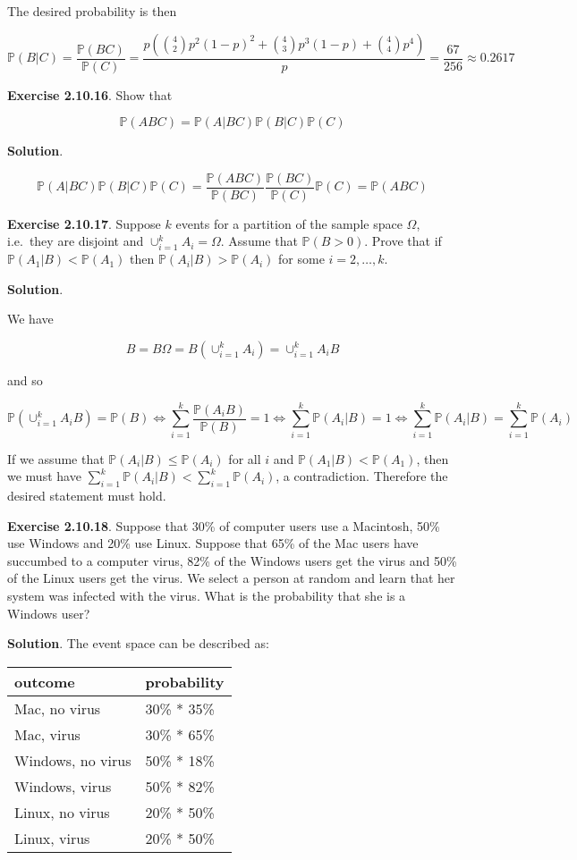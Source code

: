 The desired probability is then

\[ \mathbb{P}(B | C) = \frac{\mathbb{P}(BC)}{\mathbb{P}(C)} = \frac{p \left(\binom{4}{2} p^2 (1-p)^2 + \binom{4}{3} p^3 (1 - p) + \binom{4}{4} p^4 \right)}{ p } = \frac{67}{256} \approx 0.2617 \]

\textbf{Exercise 2.10.16}. Show that

\[  \mathbb{P}(ABC) = \mathbb{P}(A | BC) \mathbb{P}(B | C) \mathbb{P}(C) \]

\textbf{Solution}.

\[ \mathbb{P}(A | BC) \mathbb{P}(B | C) \mathbb{P}(C) = \frac{\mathbb{P}(ABC)}{\mathbb{P}(BC)}  \frac{\mathbb{P}(BC)}{\mathbb{P}(C)} \mathbb{P}(C) = \mathbb{P}(ABC) \]

\textbf{Exercise 2.10.17}. Suppose \(k\) events for a partition of the
sample space \(\Omega\), i.e.~they are disjoint and
\(\cup_{i=1}^k A_i = \Omega\). Assume that \(\mathbb{P}(B > 0)\). Prove
that if \(\mathbb{P}(A_1 | B) < \mathbb{P}(A_1)\) then
\(\mathbb{P}(A_i | B) > \mathbb{P}(A_i)\) for some \(i = 2, \dots, k\).

\textbf{Solution}.

We have

\[ B = B\Omega = B \left( \cup_{i=1}^k A_i \right) = \cup_{i=1}^k A_i B \]

and so

\[ \mathbb{P}\left( \cup_{i=1}^k A_i B \right) = \mathbb{P}(B) 
\Longleftrightarrow \sum_{i=1}^k \frac{\mathbb{P}(A_i B)}{\mathbb{P}(B)} = 1
\Longleftrightarrow \sum_{i=1}^k \mathbb{P}(A_i | B) = 1
\Longleftrightarrow \sum_{i=1}^k \mathbb{P}(A_i | B) = \sum_{i=1}^k \mathbb{P}(A_i)
\]

If we assume that \(\mathbb{P}(A_i | B) \leq \mathbb{P}(A_i)\) for all
\(i\) and \(\mathbb{P}(A_1 | B) < \mathbb{P}(A_1)\), then we must have
\(\sum_{i=1}^k \mathbb{P}(A_i | B) < \sum_{i=1}^k \mathbb{P}(A_i)\), a
contradiction. Therefore the desired statement must hold.

\textbf{Exercise 2.10.18}. Suppose that 30\% of computer users use a
Macintosh, 50\% use Windows and 20\% use Linux. Suppose that 65\% of the
Mac users have succumbed to a computer virus, 82\% of the Windows users
get the virus and 50\% of the Linux users get the virus. We select a
person at random and learn that her system was infected with the virus.
What is the probability that she is a Windows user?

\textbf{Solution}. The event space can be described as:

\begin{longtable}[]{@{}ll@{}}
\toprule\noalign{}
outcome & probability \\
\midrule\noalign{}
\endhead
\bottomrule\noalign{}
\endlastfoot
Mac, no virus & 30\% * 35\% \\
Mac, virus & 30\% * 65\% \\
Windows, no virus & 50\% * 18\% \\
Windows, virus & 50\% * 82\% \\
Linux, no virus & 20\% * 50\% \\
Linux, virus & 20\% * 50\% \\
\end{longtable}

